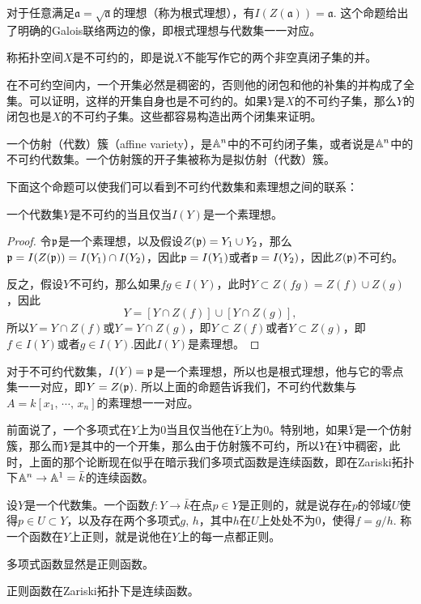 对于任意满足$\mathfrak{a}=\sqrt{\mathfrak{a}}$的理想（称为根式理想），有$I(Z(\mathfrak{a}))=\mathfrak{a}$. 这个命题给出了明确的Galois联络两边的像，即根式理想与代数集一一对应。

\para 称拓扑空间$X$是不可约的，即是说$X$不能写作它的两个非空真闭子集的并。

在不可约空间内，一个开集必然是稠密的，否则他的闭包和他的补集的并构成了全集。可以证明，这样的开集自身也是不可约的。如果$Y$是$X$的不可约子集，那么$Y$的闭包也是$X$的不可约子集。这些都容易构造出两个闭集来证明。
 
\para 一个仿射（代数）簇（affine variety），是$\mathbb{A}^n$中的不可约闭子集，或者说是$\mathbb{A}^n$中的不可约代数集。一个仿射簇的开子集被称为是拟仿射（代数）簇。

下面这个命题可以使我们可以看到不可约代数集和素理想之间的联系：

\begin{pro}
一个代数集$Y$是不可约的当且仅当$I(Y)$是一个素理想。
\end{pro}

\begin{proof} 令$\mathfrak{p}$是一个素理想，以及假设$Z(\mathfrak{p})=Y_1\cup Y_2$，那么$\mathfrak{p}=I(Z(\mathfrak{p}))=I(Y_1)\cap I(Y_2)$，因此$\mathfrak{p}=I(Y_1)$或者$\mathfrak{p}=I(Y_2)$，因此$Z(\mathfrak{p})$不可约。

反之，假设$Y$不可约，那么如果$fg\in I(Y)$，此时$Y\subset Z(fg)=Z(f)\cup Z(g)$，因此
\[
	Y=[Y\cap Z(f)]\cup [Y\cap Z(g)],
\]
所以$Y=Y\cap Z(f)$或$Y=Y\cap Z(g)$，即$Y\subset Z(f)$或者$Y\subset Z(g)$，即$f\in I(Y)$或者$g\in I(Y)$.因此$I(Y)$是素理想。\end{proof}

对于不可约代数集，$I(Y)=\mathfrak{p}$是一个素理想，所以也是根式理想，他与它的零点集一一对应，即$Y=Z(\mathfrak{p})$. 所以上面的命题告诉我们，不可约代数集与$A=k[x_1,\,\cdots\!,\,x_n]$的素理想一一对应。

前面说了，一个多项式在$Y$上为$0$当且仅当他在$\bar{Y}$上为$0$。特别地，如果$\bar{Y}$是一个仿射簇，那么而$Y$是其中的一个开集，那么由于仿射簇不可约，所以$Y$在$\bar{Y}$中稠密，此时，上面的那个论断现在似乎在暗示我们多项式函数是连续函数，即在Zariski拓扑下$\mathbb{A}^n\to \mathbb{A}^1=\bar{k}$的连续函数。

\para 设$Y$是一个代数集。一个函数$f:Y\to \bar{k}$在点$p\in Y$是正则的，就是说存在$p$的邻域$U$使得$p\in U\subset Y$，以及存在两个多项式$g$, $h$，其中$h$在$U$上处处不为$0$，使得$f=g/h$. 称一个函数在$Y$上正则，就是说他在$Y$上的每一点都正则。

多项式函数显然是正则函数。

\begin{pro}
正则函数在Zariski拓扑下是连续函数。
\end{pro}

